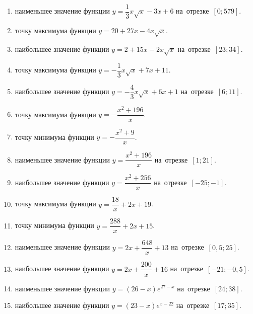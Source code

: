 \documentclass[a4paper,10pt]{article}
\begin{document}
\begin{enumerate}
\item {} наименьшее значение функции $y=\dfrac{1}{3}x\sqrt{x} -3x+6$ на~отрезке~$\left[0;579\right]$.

\item {} точку максимума функции $y=20+27x -4x\sqrt{x}$.

\item {} наибольшее значение функции $y=2+15x -2x\sqrt{x}$ на~отрезке~$\left[23;34\right]$.

\item {} точку максимума функции $y=-\dfrac{1}{3}x\sqrt{x} +7x+11$.

\item {} наибольшее значение функции $y=-\dfrac{4}{3}x\sqrt{x} +6x+1$ на~отрезке~$\left[6;11\right]$.

\item {} точку максимума функции $y=-\dfrac{x^2 +196}{x}$.

\item {} точку минимума функции $y=-\dfrac{x^2 +9}{x}$.

\item {} наименьшее значение функции $y=\dfrac{x^2 +196}{x}$ на~отрезке~$\left[1;21\right]$.

\item {} наибольшее значение функции $y=\dfrac{x^2 +256}{x}$ на~отрезке~$\left[-25;-1\right]$.

\item {} точку максимума функции $y=\dfrac{18}{x} +2x+19$.

\item {} точку минимума функции $y=\dfrac{288}{x} +2x+15$.

\item {} наименьшее значение функции $y=2x+\dfrac{648}{x} +13$ на~отрезке~$\left[0,5;25\right]$.

\item {} наибольшее значение функции $y=2x+\dfrac{200}{x} +16$ на~отрезке~$\left[-21;-0,5\right]$.

\item {} наименьшее значение функции $y=\left(26-x\right)e^{27-x}$ на~отрезке~$\left[24;38\right]$.

\item {} наибольшее значение функции $y=\left(23-x\right)e^{x-22}$ на~отрезке~$\left[17;35\right]$.


\end{enumerate}
\end{document}
